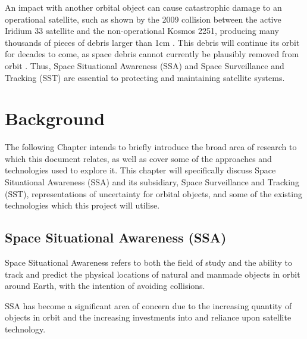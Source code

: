 \documentclass[12pt,openany,a4paper]{book}
\begin{document}
		An impact with another orbital object can cause catastrophic damage to an operational satellite, such as shown by the 2009 collision between the 
		active Iridium 33 satellite and the non-operational Kosmos 2251, producing many thousands of pieces of debris larger than 1cm \cite{Kelso}. 
		This debris will continue its orbit for decades to come, as space debris cannot currently be plausibly removed from orbit \cite{Kelso}.
		Thus, Space Situational Awareness (SSA) and Space Surveillance and Tracking (SST) are essential to protecting and maintaining satellite systems. \newline
	
	
	
	
	\chapter{Background}
	
	
	
	
	
	The following Chapter intends to briefly introduce the broad area of research to which this document relates, as well as cover some of the approaches and technologies used to explore it.
	This chapter will specifically discuss Space Situational Awareness (SSA) and its subsidiary, Space Surveillance and Tracking (SST), representations of uncertainty for orbital objects, and some of the existing technologies which this project will utilise. \newline
	 
		\section{Space Situational Awareness (SSA)}
		
		Space Situational Awareness refers to both the field of study and the ability to track and predict the physical locations of natural and manmade objects in orbit around Earth, with the intention of avoiding collisions. \newline 
		
		SSA has become a significant area of concern due to the increasing quantity of objects in orbit and the increasing investments into and reliance upon satellite technology. \newline
	
\end{document}
